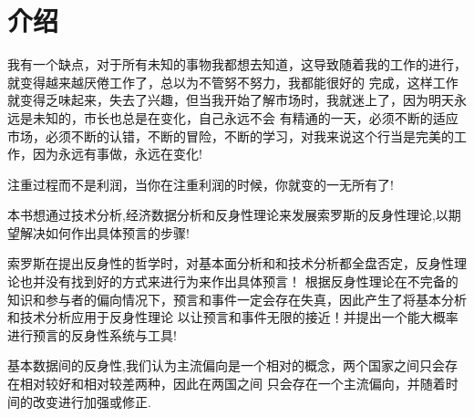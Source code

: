 \chapter{介绍}

我有一个缺点，对于所有未知的事物我都想去知道，这导致随着我的工作的进行，就变得越来越厌倦工作了，总以为不管努不努力，我都能很好的
完成，这样工作就变得乏味起来，失去了兴趣，但当我开始了解市场时，我就迷上了，因为明天永远是未知的，市长也总是在变化，自己永远不会
有精通的一天，必须不断的适应市场，必须不断的认错，不断的冒险，不断的学习，对我来说这个行当是完美的工作，因为永远有事做，永远在变化!

注重过程而不是利润，当你在注重利润的时候，你就变的一无所有了!


本书想通过技术分析,经济数据分析和反身性理论来发展索罗斯的反身性理论,以期望解决如何作出具体预言的步骤! 

索罗斯在提出反身性的哲学时，对基本面分析和和技术分析都全盘否定，反身性理论也并没有找到好的方式来进行为来作出具体预言！
根据反身性理论在不完备的知识和参与者的偏向情况下，预言和事件一定会存在失真，因此产生了将基本分析和技术分析应用于反身性理论
以让预言和事件无限的接近！并提出一个能大概率进行预言的反身性系统与工具!

基本数据间的反身性,我们认为主流偏向是一个相对的概念，两个国家之间只会存在相对较好和相对较差两种，因此在两国之间
只会存在一个主流偏向，并随着时间的改变进行加强或修正.



